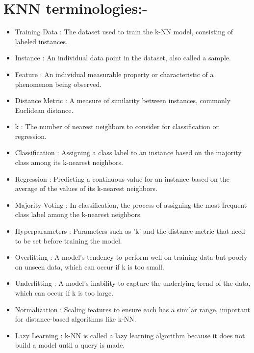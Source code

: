 \documentclass[12pt,a4paper]{report}
\begin{document}
\section*{KNN terminologies:-}
\begin{itemize}
\item Training Data : The dataset used to train the k-NN model, consisting of labeled instances.
\item Instance : An individual data point in the dataset, also called a sample.
\item Feature : An individual measurable property or characteristic of a phenomenon being observed.
\item Distance Metric : A measure of similarity between instances, commonly Euclidean distance.
\item k : The number of nearest neighbors to consider for classification or regression.
\item Classification : Assigning a class label to an instance based on the majority class among its k-nearest neighbors.
\item Regression : Predicting a continuous value for an instance based on the average of the values of its k-nearest neighbors.
\item Majority Voting : In classification, the process of assigning the most frequent class label among the k-nearest neighbors.
\item Hyperparameters : Parameters such as 'k' and the distance metric that need to be set before training the model.
\item Overfitting : A model's tendency to perform well on training data but poorly on unseen data, which can occur if k is too small.
\item Underfitting : A model's inability to capture the underlying trend of the data, which can occur if k is too large.
\item Normalization : Scaling features to ensure each has a similar range, important for distance-based algorithms like k-NN.
\item Lazy Learning : k-NN is called a lazy learning algorithm because it does not build a model until a query is made.
\end{itemize}
\end{document}
